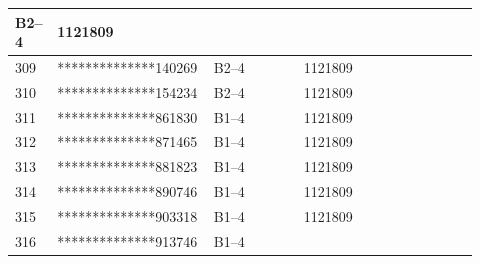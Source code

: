 \documentclass[UTF8,10pt,a4paper,fontset=fandol]{ctexart}
\newcommand{\fieldvalue}[1]{#1}
\begin{document}
\begin{tabular}{|p{0.08\linewidth}|p{0.28\linewidth}|p{0.19\linewidth}|p{0.19\linewidth}|p{0.18\linewidth}|}
\fieldvalue{B2--4} &
\fieldvalue{1121809} & \\ \hline
309 &
\fieldvalue{**************140269} &
\fieldvalue{B2--4} &
\fieldvalue{1121809} & \\ \hline
310 &
\fieldvalue{**************154234} &
\fieldvalue{B2--4} &
\fieldvalue{1121809} & \\ \hline
311 &
\fieldvalue{**************861830} &
\fieldvalue{B1--4} &
\fieldvalue{1121809} & \\ \hline
312 &
\fieldvalue{**************871465} &
\fieldvalue{B1--4} &
\fieldvalue{1121809} & \\ \hline
313 &
\fieldvalue{**************881823} &
\fieldvalue{B1--4} &
\fieldvalue{1121809} & \\ \hline
314 &
\fieldvalue{**************890746} &
\fieldvalue{B1--4} &
\fieldvalue{1121809} & \\ \hline
315 &
\fieldvalue{**************903318} &
\fieldvalue{B1--4} &
\fieldvalue{1121809} & \\ \hline
316 &
\fieldvalue{**************913746} &
\fieldvalue{B1--4} &

\end{tabular}
\end{document}
